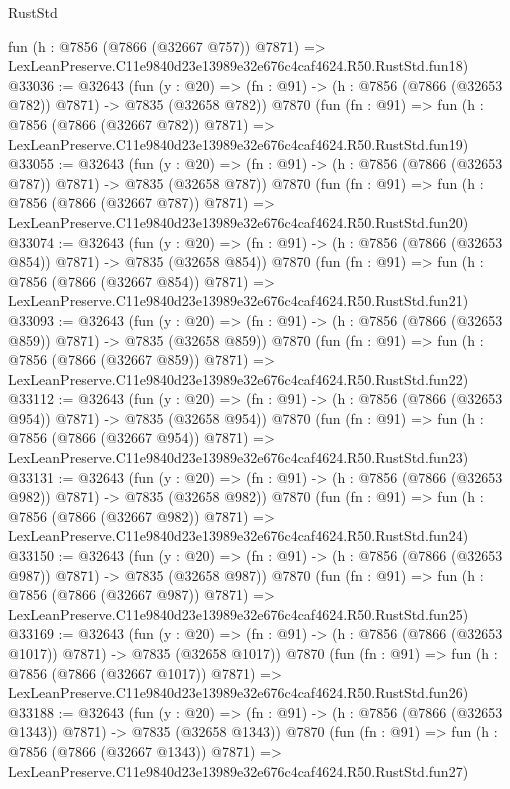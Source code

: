 \begin{lexlean}{RustStd}
\begin{coremodule}
    fun (h : @7856 (@7866 (@32667 @757)) @7871) =>
    LexLeanPreserve.C11e9840d23e13989e32e676c4caf4624.R50.RustStd.fun18)
@33036 := @32643
    (fun (y : @20) => (fn : @91) -> (h : @7856 (@7866 (@32653 @782)) @7871) -> @7835 (@32658 @782))
    @7870
    (fun (fn : @91) =>
    fun (h : @7856 (@7866 (@32667 @782)) @7871) =>
    LexLeanPreserve.C11e9840d23e13989e32e676c4caf4624.R50.RustStd.fun19)
@33055 := @32643
    (fun (y : @20) => (fn : @91) -> (h : @7856 (@7866 (@32653 @787)) @7871) -> @7835 (@32658 @787))
    @7870
    (fun (fn : @91) =>
    fun (h : @7856 (@7866 (@32667 @787)) @7871) =>
    LexLeanPreserve.C11e9840d23e13989e32e676c4caf4624.R50.RustStd.fun20)
@33074 := @32643
    (fun (y : @20) => (fn : @91) -> (h : @7856 (@7866 (@32653 @854)) @7871) -> @7835 (@32658 @854))
    @7870
    (fun (fn : @91) =>
    fun (h : @7856 (@7866 (@32667 @854)) @7871) =>
    LexLeanPreserve.C11e9840d23e13989e32e676c4caf4624.R50.RustStd.fun21)
@33093 := @32643
    (fun (y : @20) => (fn : @91) -> (h : @7856 (@7866 (@32653 @859)) @7871) -> @7835 (@32658 @859))
    @7870
    (fun (fn : @91) =>
    fun (h : @7856 (@7866 (@32667 @859)) @7871) =>
    LexLeanPreserve.C11e9840d23e13989e32e676c4caf4624.R50.RustStd.fun22)
@33112 := @32643
    (fun (y : @20) => (fn : @91) -> (h : @7856 (@7866 (@32653 @954)) @7871) -> @7835 (@32658 @954))
    @7870
    (fun (fn : @91) =>
    fun (h : @7856 (@7866 (@32667 @954)) @7871) =>
    LexLeanPreserve.C11e9840d23e13989e32e676c4caf4624.R50.RustStd.fun23)
@33131 := @32643
    (fun (y : @20) => (fn : @91) -> (h : @7856 (@7866 (@32653 @982)) @7871) -> @7835 (@32658 @982))
    @7870
    (fun (fn : @91) =>
    fun (h : @7856 (@7866 (@32667 @982)) @7871) =>
    LexLeanPreserve.C11e9840d23e13989e32e676c4caf4624.R50.RustStd.fun24)
@33150 := @32643
    (fun (y : @20) => (fn : @91) -> (h : @7856 (@7866 (@32653 @987)) @7871) -> @7835 (@32658 @987))
    @7870
    (fun (fn : @91) =>
    fun (h : @7856 (@7866 (@32667 @987)) @7871) =>
    LexLeanPreserve.C11e9840d23e13989e32e676c4caf4624.R50.RustStd.fun25)
@33169 := @32643
    (fun (y : @20) =>
    (fn : @91) -> (h : @7856 (@7866 (@32653 @1017)) @7871) -> @7835 (@32658 @1017))
    @7870
    (fun (fn : @91) =>
    fun (h : @7856 (@7866 (@32667 @1017)) @7871) =>
    LexLeanPreserve.C11e9840d23e13989e32e676c4caf4624.R50.RustStd.fun26)
@33188 := @32643
    (fun (y : @20) =>
    (fn : @91) -> (h : @7856 (@7866 (@32653 @1343)) @7871) -> @7835 (@32658 @1343))
    @7870
    (fun (fn : @91) =>
    fun (h : @7856 (@7866 (@32667 @1343)) @7871) =>
    LexLeanPreserve.C11e9840d23e13989e32e676c4caf4624.R50.RustStd.fun27)

\end{coremodule}
\end{lexlean}
